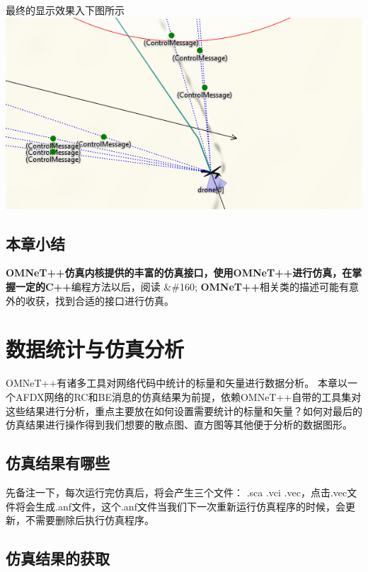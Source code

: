 最终的显示效果入下图所示
\includegraphics[keepaspectratio,width=\textwidth,height=0.75\textheight]{./../img/chapter5/5-1.png}

\section{本章小结}
\label{本章小结}

\textbf{OMNeT++\textbf{仿真内核提供的丰富的仿真接口，使用}OMNeT++\textbf{进行仿真，在掌握一定的}C++}编程方法以后，阅读 \&\#160; \textbf{OMNeT++}相关类的描述可能有意外的收获，找到合适的接口进行仿真。

\chapter{数据统计与仿真分析}
\label{数据统计与仿真分析}

OMNeT++有诸多工具对网络代码中统计的标量和矢量进行数据分析。
本章以一个AFDX网络的RC和BE消息的仿真结果为前提，依赖OMNeT++自带的工具集对这些结果进行分析，重点主要放在如何设置需要统计的标量和矢量？如何对最后的仿真结果进行操作得到我们想要的散点图、直方图等其他便于分析的数据图形。

\section{仿真结果有哪些}
\label{仿真结果有哪些}

先备注一下，每次运行完仿真后，将会产生三个文件：
.sca .vci .vec，点击.vec文件将会生成.anf文件，这个.anf文件当我们下一次重新运行仿真程序的时候，会更新，不需要删除后执行仿真程序。

\section{仿真结果的获取}
\label{仿真结果的获取}

